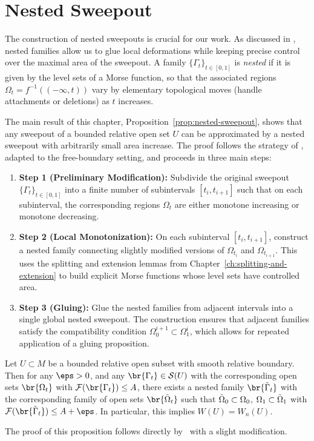 \chapter{Nested Sweepout}\label{ch:nested-sweepout}

The construction of nested sweepouts is crucial for our work. As discussed in \cite[§6]{CL20}, nested families allow us to glue local deformations while keeping precise control over the maximal area of the sweepout. A family $\{\Gamma_t\}_{t\in[0,1]}$ is \emph{nested} if it is given by the level sets of a Morse function, so that the associated regions $\Omega_t = f^{-1}((-\infty,t))$ vary by elementary topological moves (handle attachments or deletions) as $t$ increases.

The main result of this chapter, Proposition~\ref{prop:nested-sweepout}, shows that any sweepout of a bounded relative open set $U$ can be approximated by a nested sweepout with arbitrarily small area increase. The proof follows the strategy of \cite[Lemma~6.2]{CL20}, adapted to the free-boundary setting, and proceeds in three main steps:

\begin{enumerate}
\item \textbf{Step 1 (Preliminary Modification):} Subdivide the original sweepout $\{\Gamma_t\}_{t\in[0,1]}$
into a finite number of subintervals $[t_i, t_{i+1}]$ such that on each subinterval, the corresponding
regions $\Omega_t$ are either monotone increasing or monotone decreasing.

\item \textbf{Step 2 (Local Monotonization):} On each subinterval $[t_i, t_{i+1}]$, construct a nested
family connecting slightly modified versions of $\Omega_{t_i}$ and $\Omega_{t_{i+1}}$. This uses the
splitting and extension lemmas from Chapter~\ref{ch:splitting-and-extension} to build explicit Morse
functions whose level sets have controlled area.

\item \textbf{Step 3 (Gluing):} Glue the nested families from adjacent intervals into a single global
nested sweepout. The construction ensures that adjacent families satisfy the compatibility condition
$\Omega_0^{i+1} \subset \Omega_1^i$, which allows for repeated application of a gluing proposition.
\end{enumerate}
\begin{proposition}\label{prop:nested-sweepout}
    Let $U \subset M$ be a bounded relative open subset with smooth relative boundary. Then for any $\eps > 0$, and any $\br{\Gamma_t} \in \mathcal{S}(U)$ with the corresponding open sets $\br{\Omega_t}$ with $\mathcal{F}(\br{\Gamma_t}) \leq A$, there exists a nested family $\br{\Tilde{\Gamma}_t}$ with the corresponding family of open sets $\br{\Tilde{\Omega}_t}$ such that $\Tilde{\Omega}_0 \subset \Omega_0$, $\Omega_1 \subset \Tilde{\Omega}_1$ with $\mathcal{F}(\br{\Tilde{\Gamma}_t}) \leq A + \eps$. In particular, this implies $W(U) = W_n(U)$. 
\end{proposition}
The proof of this proposition follows directly by~\cite[Lemma 6.2]{CL20} with a slight modification. 
